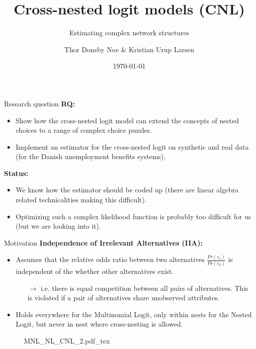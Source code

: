 \documentclass[10pt]{beamer}
\title{Cross-nested logit models (CNL)}
\subtitle{Estimating complex network structures}
\date{\today}
\author{Thor Donsby Noe \& Kristian Urup Larsen}
\institute{Department of Economics, University of Copenhagen}
\begin{document}
\maketitle


\begin{frame}{Research question}
  \textbf{RQ:}
    \begin{itemize}
      \item Show how the cross-nested logit model can extend the concepts of nested choices to a range of complex choice puzzles.
      \item Implement an estimator for the cross-nested logit on synthetic and real data (for the Danish unemployment benefits systems).
    \end{itemize}

  \textbf{Status:}
  \begin{itemize}
    \item We know how the estimator should be coded up (there are linear algebra related technicalities making this difficult).
    \item Optimizing such a complex likelihood function is probably too difficult for us (but we are looking into it).
  \end{itemize}
\end{frame}

\begin{frame}{Motivation}
\textbf{Independence of Irrelevant Alternatives (IIA):}
  \begin{itemize}
    \item Assumes that the relative odds ratio between two alternatives $\frac{Pr(c_1)}{Pr(c_2)}$ is independent of the whether other alternatives exist.
      \begin{itemize}
      \item[$\rightarrow$] i.e. there is equal competition between all pairs of alternatives. This is violated if a pair of alternatives share unobserved attributes.
      \end{itemize}
    \item Holds everywhere for the Multinomial Logit, only within nests for the Nested Logit, but never in nest where cross-nesting is allowed.
  \end{itemize}

  \begin{figure}[!h]
    \begin{center}
    \def\svgwidth{0.90\columnwidth}
    {MNL_NL_CNL_2.pdf_tex}
    \end{center}
  \end{figure}


\end{frame}
\end{document}
